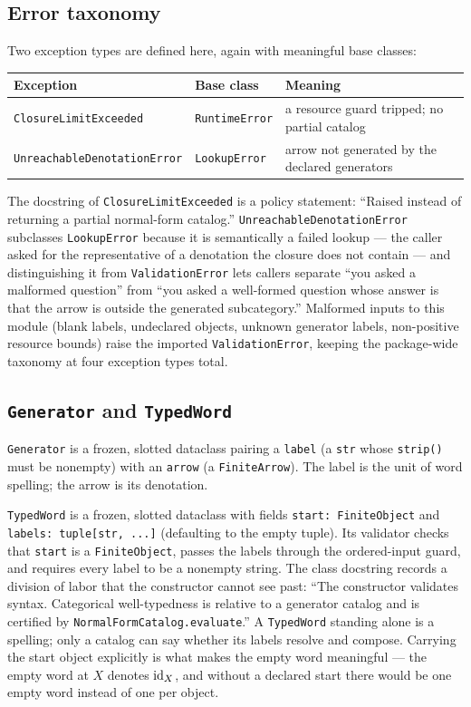 \subsection{Error taxonomy}

Two exception types are defined here, again with meaningful base classes:

\begin{center}
\begin{tabular}{@{}lll@{}}
\toprule
Exception & Base class & Meaning \\
\midrule
\texttt{ClosureLimitExceeded} & \texttt{RuntimeError} & a resource guard tripped; no partial catalog \\
\texttt{UnreachableDenotationError} & \texttt{LookupError} & arrow not generated by the declared generators \\
\bottomrule
\end{tabular}
\end{center}

The docstring of \texttt{ClosureLimitExceeded} is a policy statement:
``Raised instead of returning a partial normal-form catalog.''
\texttt{UnreachableDenotationError} subclasses \texttt{LookupError} because
it is semantically a failed lookup --- the caller asked for the
representative of a denotation the closure does not contain --- and
distinguishing it from \texttt{ValidationError} lets callers separate
``you asked a malformed question'' from ``you asked a well-formed question
whose answer is that the arrow is outside the generated subcategory.''
Malformed inputs to this module (blank labels, undeclared objects, unknown
generator labels, non-positive resource bounds) raise the imported
\texttt{ValidationError}, keeping the package-wide taxonomy at four
exception types total.

\subsection{\texttt{Generator} and \texttt{TypedWord}}

\texttt{Generator} is a frozen, slotted dataclass pairing a \texttt{label}
(a \texttt{str} whose \texttt{strip()} must be nonempty) with an
\texttt{arrow} (a \texttt{FiniteArrow}). The label is the unit of word
spelling; the arrow is its denotation.

\texttt{TypedWord} is a frozen, slotted dataclass with fields
\texttt{start: FiniteObject} and \texttt{labels: tuple[str, ...]}
(defaulting to the empty tuple). Its validator checks that \texttt{start}
is a \texttt{FiniteObject}, passes the labels through the ordered-input
guard, and requires every label to be a nonempty string. The class
docstring records a division of labor that the constructor cannot see
past: ``The constructor validates syntax. Categorical well-typedness is
relative to a generator catalog and is certified by
\texttt{NormalFormCatalog.evaluate}.'' A \texttt{TypedWord} standing alone
is a spelling; only a catalog can say whether its labels resolve and
compose. Carrying the start object explicitly is what makes the empty word
meaningful --- the empty word at $X$ denotes $\mathrm{id}_X$, and without a
declared start there would be one empty word instead of one per object.

